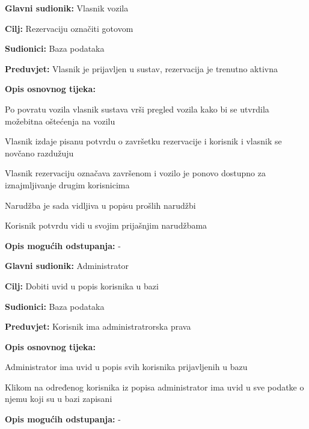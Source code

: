 					\noindent {}
					\begin{packed_item}
	
						\item \textbf{Glavni sudionik: }Vlasnik vozila
						\item  \textbf{Cilj: }Rezervaciju označiti gotovom
						\item  \textbf{Sudionici: }Baza podataka
						\item  \textbf{Preduvjet: }Vlasnik je prijavljen u sustav, rezervacija je trenutno aktivna
						\item  \textbf{Opis osnovnog tijeka:}
						
						\item[] \begin{packed_enum}
							\item Po povratu vozila vlasnik sustava vrši pregled vozila kako bi se utvrdila možebitna oštećenja na vozilu
							\item Vlasnik izdaje pisanu potvrdu o završetku rezervacije i korisnik i vlasnik se novčano razdužuju
							\item Vlasnik rezervaciju označava završenom i vozilo je ponovo dostupno za iznajmljivanje drugim korisnicima
							\item Narudžba je sada vidljiva u popisu prošlih narudžbi
							\item Korisnik potvrdu vidi u svojim prijašnjim narudžbama
						\end{packed_enum}
						
						\item  \textbf{Opis mogućih odstupanja:} -
					\end{packed_item}
					
					
					\noindent \underbar{\textbf{UC 20 - Pregled korisnika}}
					\begin{packed_item}
	
						\item \textbf{Glavni sudionik: }Administrator
						\item  \textbf{Cilj: }Dobiti uvid u popis korisnika u bazi
						\item  \textbf{Sudionici: }Baza podataka
						\item  \textbf{Preduvjet: }Korisnik ima administratrorska prava
						\item  \textbf{Opis osnovnog tijeka:}
						
						\item[] \begin{packed_enum}
							\item Administrator ima uvid u popis svih korisnika prijavljenih u bazu
							\item Klikom na određenog korisnika iz popisa administrator ima uvid u sve podatke o njemu koji su u bazi zapisani
						\end{packed_enum}
						
						\item  \textbf{Opis mogućih odstupanja: }-
					\end{packed_item}
					
